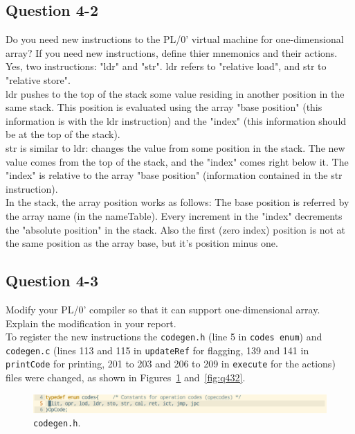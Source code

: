 \documentclass{article}
\begin{document}
\subsection*{Question 4-2}
Do you need new instructions to the PL/0' virtual machine for one-dimensional array?
If you need new instructions, define thier mnemonics and their actions.\\[0.3cm]


\ifreport
Yes, two instructions: "ldr" and "str". ldr refers to "relative load", and str to "relative store". \\
ldr pushes to the top of the stack some value residing in another position in the same stack. This position is evaluated using the array "base position" (this information is with the ldr instruction) and the "index" (this information should be at the top of the stack).\\
str is similar to ldr: changes the value from some position in the stack. The new value comes from the top of the stack, and the "index" comes right below it. The "index" is relative to the array "base position" (information contained in the str instruction).\\
In the stack, the array position works as follows: The base position is referred by the array name (in the nameTable). Every increment in the "index" decrements the "absolute position" in the stack. Also the first (zero index) position is not at the same position as the array base, but it's position minus one.\\[0.3cm]
\fi


\subsection*{Question 4-3}
Modify your PL/0' compiler so that it can support one-dimensional array.
Explain the modification in your report.\\[0.3cm]

\ifreport
To register the new instructions the {\tt codegen.h} (line 5 in {\tt codes enum}) and {\tt codegen.c} (lines 113 and 115 in {\tt updateRef} for flagging, 139 and 141 in {\tt printCode} for printing, 201 to 203 and 206 to 209 in {\tt execute} for the actions) files were changed, as shown in Figures~\ref{fig:q431} and~\ref{fig:q432}.\\

\begin{figure}[h]
  \includegraphics[scale=0.35]{./img/Q4-3-1.png}
  \centering
  \caption{{\tt codegen.h}.}
  \label{fig:q431}
\end{figure}
\end{document}
